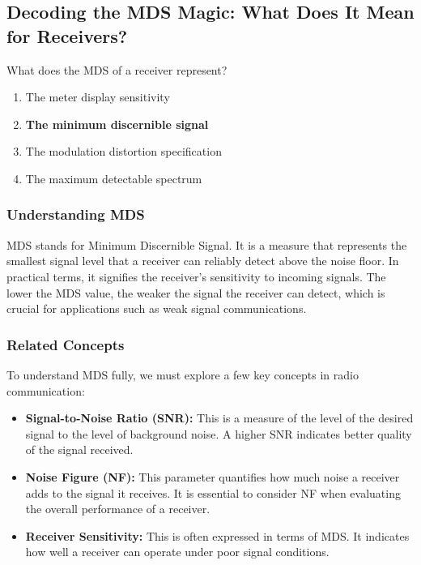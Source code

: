 \subsection{Decoding the MDS Magic: What Does It Mean for Receivers?}

\begin{tcolorbox}[colback=gray!10, colframe=black, title=E4C07] What does the MDS of a receiver represent? 
\begin{enumerate}[label=\Alph*.]
    \item The meter display sensitivity
    \item \textbf{The minimum discernible signal}
    \item The modulation distortion specification
    \item The maximum detectable spectrum
\end{enumerate} \end{tcolorbox}

\subsubsection{Understanding MDS}

MDS stands for Minimum Discernible Signal. It is a measure that represents the smallest signal level that a receiver can reliably detect above the noise floor. In practical terms, it signifies the receiver's sensitivity to incoming signals. The lower the MDS value, the weaker the signal the receiver can detect, which is crucial for applications such as weak signal communications.

\subsubsection{Related Concepts}

To understand MDS fully, we must explore a few key concepts in radio communication:

\begin{itemize}
    \item \textbf{Signal-to-Noise Ratio (SNR):} This is a measure of the level of the desired signal to the level of background noise. A higher SNR indicates better quality of the signal received.
    
    \item \textbf{Noise Figure (NF):} This parameter quantifies how much noise a receiver adds to the signal it receives. It is essential to consider NF when evaluating the overall performance of a receiver.
    
    \item \textbf{Receiver Sensitivity:} This is often expressed in terms of MDS. It indicates how well a receiver can operate under poor signal conditions.
\end{itemize}

